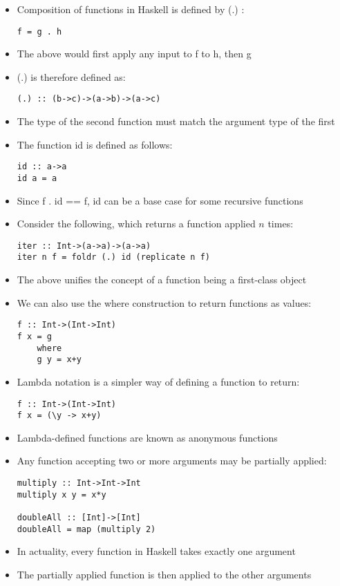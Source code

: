\documentclass{article}
\begin{document}
\begin{itemize}
\item Composition of functions in Haskell is defined by (.) :
\begin{lstlisting}
f = g . h
\end{lstlisting}
\item The above would first apply any input to f to h, then g
\item (.) is therefore defined as:
\begin{lstlisting}
(.) :: (b->c)->(a->b)->(a->c)
\end{lstlisting}
\item The type of the second function must match the argument type of the first
\item The function id is defined as follows:
\begin{lstlisting}
id :: a->a
id a = a
\end{lstlisting}
\item Since f . id == f, id can be a base case for some recursive functions
\item Consider the following, which returns a function applied $n$ times:
\begin{lstlisting}
iter :: Int->(a->a)->(a->a)
iter n f = foldr (.) id (replicate n f)
\end{lstlisting}
\item The above unifies the concept of a function being a first-class object
\item We can also use the where construction to return functions as values:
\begin{lstlisting}
f :: Int->(Int->Int)
f x	= g
	where
	g y = x+y
\end{lstlisting}
\item Lambda notation is a simpler way of defining a function to return:
\begin{lstlisting}
f :: Int->(Int->Int)
f x = (\y -> x+y)
\end{lstlisting}
\item Lambda-defined functions are known as anonymous functions
\item Any function accepting two or more arguments may be partially applied:
\begin{lstlisting}
multiply :: Int->Int->Int
multiply x y = x*y

doubleAll :: [Int]->[Int]
doubleAll = map (multiply 2)
\end{lstlisting}
\item In actuality, every function in Haskell takes exactly one argument
\item The partially applied function is then applied to the other arguments
\end{itemize}
\end{document}
